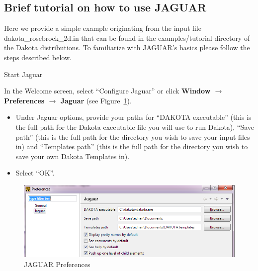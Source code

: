 \newpage
\subsection{Brief tutorial on how to use JAGUAR}

Here we provide a simple example originating from the input file dakota\_rosebrock\_2d.in that can be found in the examples/tutorial
directory of the Dakota distributions. To familiarize with JAGUAR's basics please follow the steps described below.

Start Jaguar

In the Welcome screen, select ``Configure Jaguar'' or click {\bf Window $\rightarrow$ Preferences $\rightarrow$ Jaguar} (see Figure~\ref{fig:input:0Preferences}).
\begin{itemize}
\item Under Jaguar options, provide your paths for ``DAKOTA executable'' (this is the full path for the Dakota executable file you will use to run Dakota), ``Save path'' (this is the full path for the directory you wish to save your input files in) and ``Templates path'' (this is the full path for the directory you wish to save your own Dakota Templates in).
\item Select ``OK''.
\end{itemize}
\begin{figure}[htbp]
  \centering
  \includegraphics[scale=0.6]{images/0Preferences}
  \caption{JAGUAR Preferences}
  \label{fig:input:0Preferences}
\end{figure}


